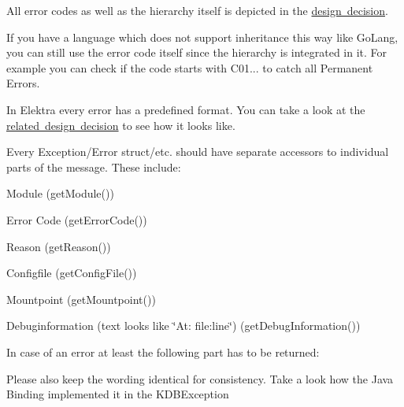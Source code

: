 All error codes as well as the hierarchy itself is depicted in the \mbox{\hyperlink{doc_decisions_error_codes_md}{design decision}}.

If you have a language which does not support inheritance this way like Go\+Lang, you can still use the error code itself since the hierarchy is integrated in it. For example you can check if the code starts with {\ttfamily C01...} to catch all {\ttfamily Permanent Errors}.

In Elektra every error has a predefined format. You can take a look at the \mbox{\hyperlink{doc_decisions_error_message_format_md}{related design decision}} to see how it looks like.

Every Exception/\+Error struct/etc. should have separate accessors to individual parts of the message. These include\+:


\begin{DoxyEnumerate}
\item Module (get\+Module())
\item Error Code (get\+Error\+Code())
\item Reason (get\+Reason())
\item Configfile (get\+Config\+File())
\item Mountpoint (get\+Mountpoint())
\item Debuginformation (text looks like \char`\"{}\+At\+: file\+:line\char`\"{}) (get\+Debug\+Information())
\end{DoxyEnumerate}

In case of an error at least the following part has to be returned\+:


\begin{DoxyCode}{0}
\end{DoxyCode}


Please also keep the wording identical for consistency. Take a look how the Java Binding implemented it in the K\+D\+B\+Exception 